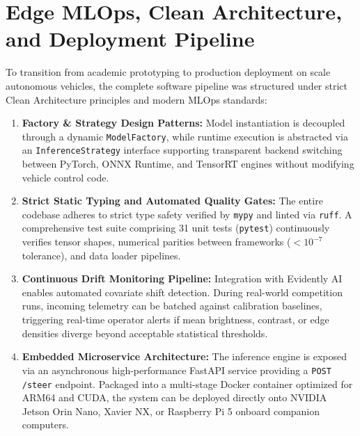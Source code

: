 \documentclass[10pt,journal,compsoc]{IEEEtran}
\begin{document}
\section{Edge MLOps, Clean Architecture, and Deployment Pipeline}
\label{sec:mlops}

To transition from academic prototyping to production deployment on scale autonomous vehicles, the complete software pipeline was structured under strict Clean Architecture principles and modern MLOps standards:
\begin{enumerate}
    \item \textbf{Factory \& Strategy Design Patterns:} Model instantiation is decoupled through a dynamic \texttt{ModelFactory}, while runtime execution is abstracted via an \texttt{InferenceStrategy} interface supporting transparent backend switching between PyTorch, ONNX Runtime, and TensorRT engines without modifying vehicle control code.
    \item \textbf{Strict Static Typing and Automated Quality Gates:} The entire codebase adheres to strict type safety verified by \texttt{mypy} and linted via \texttt{ruff}. A comprehensive test suite comprising 31 unit tests (\texttt{pytest}) continuously verifies tensor shapes, numerical parities between frameworks ($< 10^{-7}$ tolerance), and data loader pipelines.
    \item \textbf{Continuous Drift Monitoring Pipeline:} Integration with Evidently AI enables automated covariate shift detection. During real-world competition runs, incoming telemetry can be batched against calibration baselines, triggering real-time operator alerts if mean brightness, contrast, or edge densities diverge beyond acceptable statistical thresholds.
    \item \textbf{Embedded Microservice Architecture:} The inference engine is exposed via an asynchronous high-performance FastAPI service providing a \texttt{POST /steer} endpoint. Packaged into a multi-stage Docker container optimized for ARM64 and CUDA, the system can be deployed directly onto NVIDIA Jetson Orin Nano, Xavier NX, or Raspberry Pi 5 onboard companion computers.
\end{enumerate}

\end{document}
